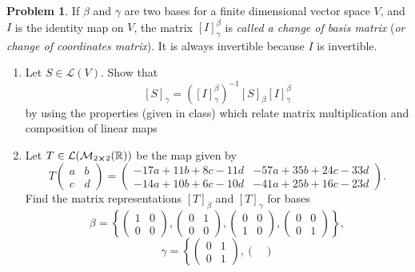 \documentclass[10pt]{article}
\theoremstyle{definition}
\newtheorem{problem}{Problem}
\begin{document}
\begin{problem}
If $\beta$ and $\gamma$ are two bases for a finite dimensional vector space $V$,
and $I$ is the identity map on $V$, the matrix $\left[I\right]_\gamma^\beta$ is \emph{called a change of basis matrix}
(\emph{or change of coordinates matrix}). It is always invertible because $I$ is invertible.
\begin{enumerate}[label=(\alph*)]
  \item Let $S\in \mathcal{L}(V)$. Show that
        $$\left[S\right]_\gamma=\left(\left[I\right]_\gamma^\beta\right)^{-1}\left[S\right]_\beta\left[I\right]_\gamma^\beta$$
        by using the properties (given in class) which relate matrix multiplication and composition of linear maps
  \item Let $T\in\mathcal{L}(\mathcal{M}_{2\cross 2}(\mathbb{R}))$ be the map given by
        $$T\begin{pmatrix}
            a & b \\
            c & d
          \end{pmatrix}=
          \begin{pmatrix}
            -17a+11b+8c-11d & -57a+35b+24c-33d \\
            -14a+10b+6c-10d & -41a+25b+16c-23d
          \end{pmatrix}.$$
        Find the matrix representations $\left[T\right]_\beta$ and $\left[T\right]_\gamma$ for bases
        $$\beta=\left\{\begin{pmatrix}
            1 & 0 \\
            0 & 0
          \end{pmatrix},
          \begin{pmatrix}
            0 & 1 \\
            0 & 0
          \end{pmatrix},
          \begin{pmatrix}
            0 & 0 \\
            1 & 0
          \end{pmatrix},
          \begin{pmatrix}
            0 & 0 \\
            0 & 1
          \end{pmatrix}\right\},$$
        $$\gamma=
          \left\{\begin{pmatrix}
            0 & 1 \\
            0 & 1
          \end{pmatrix},
          \begin{pmatrix}

\end{pmatrix}$$
\end{enumerate}
\end{problem}
\end{document}
